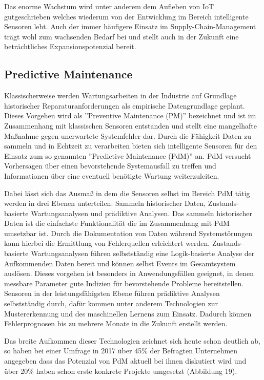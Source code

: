 \documentclass[a4paper,12pt]{scrartcl}
\begin{document}
Das enorme Wachstum wird unter anderem dem Aufleben von IoT gutgeschrieben welches wiederum von der Entwicklung im Bereich intelligente Sensoren lebt. Auch der immer häufigere Einsatz im Supply-Chain-Management trägt wohl zum wachsenden Bedarf bei und stellt auch in der Zukunft eine beträchtliches Expansionspotenzial bereit. 
\cite{PersistenceMarketResearch.}

\newpage
\subsection{Predictive Maintenance}
Klassischerweise werden Wartungsarbeiten in der Industrie auf Grundlage historischer Reparaturanforderungen als empirische Datengrundlage geplant. Dieses Vorgehen wird als ''Preventive Maintenance (PM)'' bezeichnet und ist im Zusammenhang mit klassischen Sensoren entstanden und stellt eine mangelhafte Maßnahme gegen unerwartete Systemfehler dar. Durch die Fähigkeit Daten zu sammeln und in Echtzeit zu verarbeiten bieten sich intelligente Sensoren für den Einsatz zum so genannten ''Predictive Maintenance (PdM)'' an. PdM versucht Vorhersagen über einen bevorstehende Systemausfall zu treffen und Informationen über eine eventuell benötigte Wartung weiterzuleiten. 

\cite[Seite 1]{Lee.2017}

Dabei lässt sich das Ausmaß in dem die Sensoren selbst im Bereich PdM tätig werden in drei Ebenen unterteilen: Sammeln historischer Daten, Zustands-basierte Wartungsanalysen und prädiktive Analysen. Das sammeln historischer Daten ist die einfachste Funktionalität die im Zusammenhang mit PdM umsetzbar ist. Durch die Dokumentation von Daten während Systemstörungen kann hierbei die Ermittlung von Fehlerquellen erleichtert werden. Zustands-basierte Wartungsanalysen führen selbstständig eine Logik-basierte Analyse der Aufkommenden Daten bereit und können selbst Events im Gesamtsystem auslösen. Dieses vorgehen ist besonders in Anwendungsfällen geeignet, in denen messbare Parameter gute Indizien für bevorstehende Probleme bereitstellen. Sensoren in der leistungsfähigsten Ebene führen prädiktive Analysen selbstständig durch, dafür kommen unter anderem Technologien zur Mustererkennung und des maschinellen Lernens zum Einsatz. Dadurch können Fehlerprognosen bis zu mehrere Monate in die Zukunft erstellt werden. 

\cite[Seite 28]{Labs.2018}

Das breite Aufkommen dieser Technologien zeichnet sich heute schon deutlich ab, so haben bei einer Umfrage in 2017 über 45\% der Befragten Unternehmen angegeben dass das Potenzial von PdM aktuell bei ihnen diskutiert wird und über 20\% haben schon erste konkrete Projekte umgesetzt (Abbildung 19). \\
\end{document}
